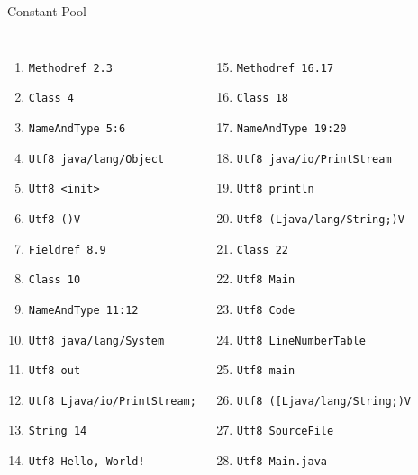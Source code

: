 \documentclass[14pt, aspectratio=1610]{beamer}
\begin{document}
\begin{frame}{Constant Pool}

\tiny
\begin{columns}
\begin{enumerate}
   \item \texttt{Methodref          2.3}
   \item \texttt{Class              4}
   \item \texttt{NameAndType        5:6}
   \item \texttt{Utf8               java/lang/Object}
   \item \texttt{Utf8               <init>}
   \item \texttt{Utf8               ()V}
   \item \texttt{Fieldref           8.9}
   \item \texttt{Class              10}
   \item \texttt{NameAndType        11:12}
   \item \texttt{Utf8               java/lang/System}
   \item \texttt{Utf8               out}
   \item \texttt{Utf8               Ljava/io/PrintStream;}
   \item \texttt{String             14}
   \item \texttt{Utf8               Hello, World!}
\end{enumerate}
\begin{enumerate}
    \setcounter{enumi}{14}
   \item \texttt{Methodref          16.17}
   \item \texttt{Class              18}
   \item \texttt{NameAndType        19:20}
   \item \texttt{Utf8               java/io/PrintStream}
   \item \texttt{Utf8               println}
   \item \texttt{Utf8               (Ljava/lang/String;)V}
   \item \texttt{Class              22}
   \item \texttt{Utf8               Main}
   \item \texttt{Utf8               Code}
   \item \texttt{Utf8               LineNumberTable}
   \item \texttt{Utf8               main}
   \item \texttt{Utf8               ([Ljava/lang/String;)V}
   \item \texttt{Utf8               SourceFile}
   \item \texttt{Utf8               Main.java}
\end{enumerate}
\end{columns}
\end{frame}
\end{document}
